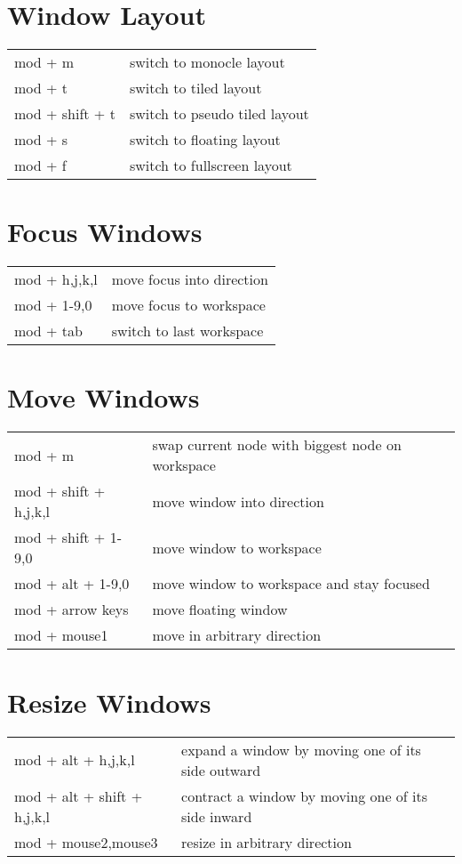 \documentclass[
    a4paper,
    10pt,
    notitlepage,
    egregdoesnotlikesansseriftitles
]{scrartcl}
\begin{document}
\section{Window Layout}
\begin{tabular}{p{4cm}l}
    mod + m             & switch to monocle layout              \\
    mod + t             & switch to tiled layout                \\
    mod + shift + t     & switch to pseudo tiled layout         \\
    mod + s             & switch to floating layout             \\
    mod + f             & switch to fullscreen layout
\end{tabular}

\section{Focus Windows}
\begin{tabular}{p{4cm}l}
    mod + h,j,k,l         & move focus into direction        \\
    mod + 1-9,0           & move focus to workspace          \\
    mod + tab             & switch to last workspace
\end{tabular}

\section{Move Windows}
\begin{tabular}{p{4cm}l}
    mod + m               & swap current node with biggest node on workspace \\
    mod + shift + h,j,k,l & move window into direction        \\
    mod + shift + 1-9,0   & move window to workspace          \\
    mod + alt + 1-9,0     & move window to workspace and stay focused        \\
    mod + arrow keys      & move floating window              \\
    mod + mouse1          & move in arbitrary direction
\end{tabular}

\section{Resize Windows}
\begin{tabular}{p{4cm}l}
    mod + alt + h,j,k,l   & expand a window by moving one of its side outward \\
    mod + alt + shift + h,j,k,l & contract a window by moving one of its side inward \\
    mod + mouse2,mouse3   & resize in arbitrary direction
\end{tabular}
\end{document}
